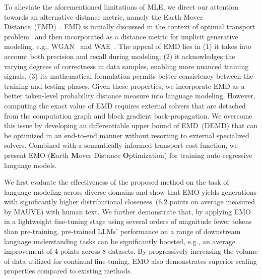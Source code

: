 To alleviate the aforementioned limitations of MLE, we direct our attention towards an alternative distance metric, namely the Earth Mover Distance~(EMD)~\citep{kantorovich1960mathematical}. EMD is initially discussed in the context of optimal transport problem~\citep{oldandnew} 
and then incorporated as a distance metric for implicit generative modeling, e.g., WGAN~\citep{wgan} and WAE~\citep{wae}. 
The appeal of EMD lies in (1) it takes into account both precision and recall during modeling; (2) it acknowledges the varying degrees of correctness in data samples, enabling more nuanced training signals. (3) its mathematical formulation permits better consistency between the training and testing phases. Given these properties, we incorporate EMD as a better token-level probability distance measure into language modeling. However, computing the exact value of EMD requires external solvers that are 
detached from the computation graph and block gradient back-propagation. We overcome this issue by developing an differentiable upper bound of EMD~(DEMD) that can be optimized in an end-to-end manner without resorting to external specialized solvers. Combined with a semantically informed transport cost function, we present EMO (\textbf{E}arth \textbf{M}over Distance \textbf{O}ptimization) for training auto-regressive language models.

We first evaluate the effectiveness of the proposed method on the task of language modeling across diverse domains and show that EMO yields generations with significantly higher distributional closeness~(6.2 points on average measured by MAUVE) with human text. We further demonstrate that, by applying EMO in a lightweight fine-tuning stage using several orders of magnitude fewer tokens than pre-training, pre-trained LLMs' performance on a range of downstream language understanding tasks can be significantly boosted, e.g., an average improvement of 4 points across 8 datasets. By progressively increasing the volume of data utilized for continual fine-tuning, EMO also demonstrates superior scaling properties compared to existing methods.
